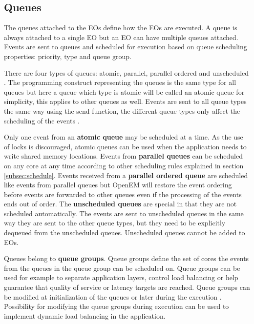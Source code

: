 \subsection{Queues}
\label{subsec:queues}
The queues attached to the EOs define how the EOs are executed. A queue is
always attached to a single EO but an EO can have multiple queues attached.
Events are sent to queues and scheduled for execution based on queue scheduling
properties: priority, type and queue group. \cite{openemintro}

There are four types of queues: atomic, parallel, parallel ordered and
unscheduled \cite{openemintro}. The programming construct representing the
queues is the same type for all queues but here a queue which type is atomic
will be called an atomic queue for simplicity, this applies to other queues as
well. Events are sent to all queue types the same way using the send function,
the different queue types only affect the scheduling of the events
\cite{openemintro}.

Only one event from an \textbf{atomic queue} may be scheduled at a time. As the
use of locks is discouraged, atomic queues can be used when the application
needs to write shared memory locations. Events from \textbf{parallel queues} can
be scheduled on any core at any time according to other scheduling rules
explained in section \ref{subsec:schedule}. Events received from a
\textbf{parallel ordered queue} are scheduled like events from parallel queues
but OpenEM will restore the event ordering before events are forwarded to other
queues even if the processing of the events ends out of order. The
\textbf{unscheduled queues} are special in that they are not scheduled
automatically. The events are sent to unscheduled queues in the same way they
are sent to the other queue types, but they need to be explicitly dequeued from
the unscheduled queues. Unscheduled queues cannot be added to EOs.
\cite{openempage}

Queues belong to \textbf{queue groups}. Queue groups define the set of cores
the events from the queues in the queue group can be scheduled on. Queue groups
can be used for example to separate application layers, control load balancing
or help guarantee that quality of service or latency targets are reached.
\cite{openemintro} Queue groups can be modified at initialization of the queues
or later during the execution \cite{openempage}. Possibility for modifying the
queue groups during execution can be used to implement dynamic load balancing
in the application.

